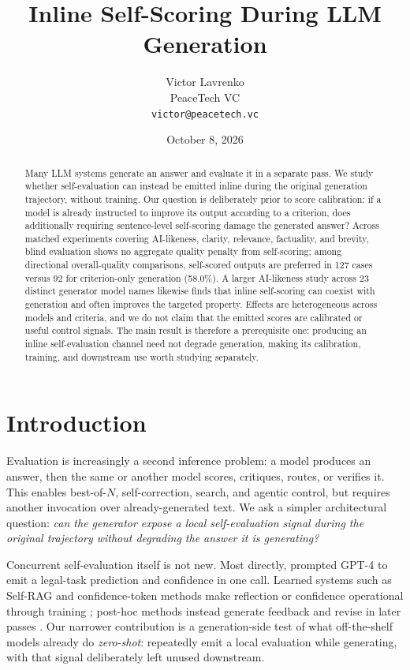\documentclass[11pt]{article}
\title{\vspace{-1.35em}\textbf{Inline Self-Scoring During LLM Generation}}
\author{Victor Lavrenko\\[-0.1em]
\small PeaceTech VC\\[-0.2em]
\small \texttt{victor@peacetech.vc}}
\date{October 8, 2026}
\begin{document}
\maketitle
\vspace{-1.35em}

\begin{abstract}
Many LLM systems generate an answer and evaluate it in a separate pass. We study whether self-evaluation can instead be emitted inline during the original generation trajectory, without training. Our question is deliberately prior to score calibration: if a model is already instructed to improve its output according to a criterion, does additionally requiring sentence-level self-scoring damage the generated answer? Across matched experiments covering AI-likeness, clarity, relevance, factuality, and brevity, blind evaluation shows no aggregate quality penalty from self-scoring; among directional overall-quality comparisons, self-scored outputs are preferred in 127 cases versus 92 for criterion-only generation (58.0\%). A larger AI-likeness study across 23 distinct generator model names likewise finds that inline self-scoring can coexist with generation and often improves the targeted property. Effects are heterogeneous across models and criteria, and we do not claim that the emitted scores are calibrated or useful control signals. The main result is therefore a prerequisite one: producing an inline self-evaluation channel need not degrade generation, making its calibration, training, and downstream use worth studying separately.
\end{abstract}

\section{Introduction}

Evaluation is increasingly a second inference problem: a model produces an answer, then the same or another model scores, critiques, routes, or verifies it. This enables best-of-$N$, self-correction, search, and agentic control, but requires another invocation over already-generated text. We ask a simpler architectural question: \emph{can the generator expose a local self-evaluation signal during the original trajectory without degrading the answer it is generating?}

Concurrent self-evaluation itself is not new. Most directly, \citet{zhao2024selfeval} prompted GPT-4 to emit a legal-task prediction and confidence in one call. Learned systems such as Self-RAG and confidence-token methods make reflection or confidence operational through training \citep{asai2024selfrag,chuang2025confidence}; post-hoc methods instead generate feedback and revise in later passes \citep{madaan2023selfrefine,xie2023selfevaluation}. Our narrower contribution is a generation-side test of what off-the-shelf models already do \emph{zero-shot}: repeatedly emit a local evaluation while generating, with that signal deliberately left unused downstream.
\end{document}
